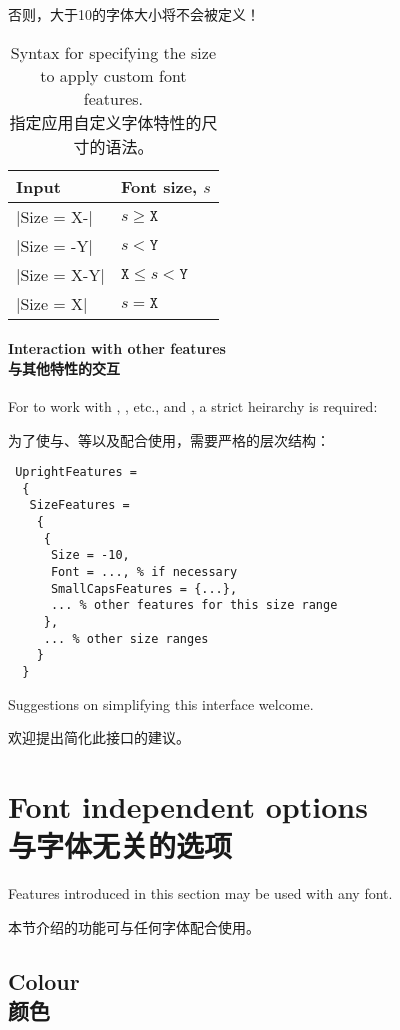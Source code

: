 \documentclass[a4paper]{l3doc}
\begin{document}
否则，大于10的字体大小将不会被定义！


\begin{table}
\caption{Syntax for specifying the size to apply custom font features.\\指定应用自定义字体特性的尺寸的语法。}\label{tab:sizing}
\centering
\begin{tabular}{@{}ll@{}}
\toprule
Input & Font size, $s$ \\
\midrule
 |Size = X-| & $s \geq \texttt{X}$ \\
 |Size = -Y| & $s < \texttt{Y}$ \\
 |Size = X-Y| & $\texttt{X} \leq s < \texttt{Y}$ \\
 |Size = X| & $s = \texttt{X}$ \\
\bottomrule
\end{tabular}
\end{table}

\paragraph{Interaction with other features\\与其他特性的交互}
For  to work with , , etc., and , a strict heirarchy is required:

为了使与、等以及配合使用，需要严格的层次结构：

\begin{Verbatim}
 UprightFeatures =
  {
   SizeFeatures =
    {
     {
      Size = -10,
      Font = ..., % if necessary
      SmallCapsFeatures = {...},
      ... % other features for this size range
     },
     ... % other size ranges
    }
  }
\end{Verbatim}
Suggestions on simplifying this interface welcome.

欢迎提出简化此接口的建议。

\section{Font independent options\\与字体无关的选项}
\label{sec:font-ind-features}

Features introduced in this section may be used with any font.

本节介绍的功能可与任何字体配合使用。

\subsection{Colour\\颜色}
\end{document}
